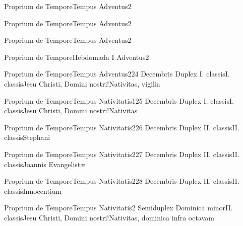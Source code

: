 \documentclass[invitatoriale-romanum.tex]{subfiles}
\begin{document}

	{Proprium de Tempore}{Tempus Adventus}{2}{}
	{}{}{}
	{}
	{}

	{Proprium de Tempore}{Tempus Adventus}{2}{}
	{}{}{}
	{}
	{}

	{Proprium de Tempore}{Tempus Adventus}{2}{}
	{}{}{}
	{}
	{}

	{Proprium de Tempore}{Hebdomada I Adventus}{2}{}
	{}{}{}
	{}
	{}

	{Proprium de Tempore}{Tempus Adventus}{2}{24 Decembris}
	{Duplex I. classis}{I. classis}{Jesu Christi, Domini nostri!Nativitas, vigilia}
	{}
	{}

\newpage
{}
	{Proprium de Tempore}{Tempus Nativitatis}{1}{25 Decembris}
	{Duplex I. classis}{I. classis}{Jesu Christi, Domini nostri!Nativitas}
	{}
	{}

	{Proprium de Tempore}{Tempus Nativitatis}{2}{26 Decembris}
	{Duplex II. classis}{II. classis}{Stephani}
	{}
	{}

	{Proprium de Tempore}{Tempus Nativitatis}{2}{27 Decembris}
	{Duplex II. classis}{II. classis}{Joannis Evangelistæ}
	{}
	{}

	{Proprium de Tempore}{Tempus Nativitatis}{2}{28 Decembris}
	{Duplex II. classis}{II. classis}{Innocentium}
	{}
	{}

	{Proprium de Tempore}{Tempus Nativitatis}{2}{}
	{Semiduplex Dominica minor}{II. classis}{Jesu Christi, Domini nostri!Nativitas, dominica infra octavam}
	{}
	{}
\end{document}
